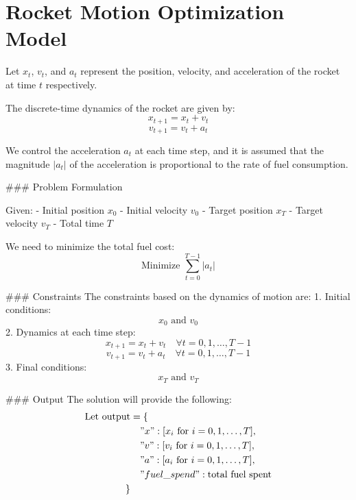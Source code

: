 \documentclass{article}
\begin{document}
\section*{Rocket Motion Optimization Model}

Let \( x_t \), \( v_t \), and \( a_t \) represent the position, velocity, and acceleration of the rocket at time \( t \) respectively. 

The discrete-time dynamics of the rocket are given by:
\[
x_{t+1} = x_t + v_t
\]
\[
v_{t+1} = v_t + a_t
\]

We control the acceleration \( a_t \) at each time step, and it is assumed that the magnitude \( |a_t| \) of the acceleration is proportional to the rate of fuel consumption.

### Problem Formulation

Given:
- Initial position \( x_0 \)
- Initial velocity \( v_0 \)
- Target position \( x_T \)
- Target velocity \( v_T \)
- Total time \( T \)

We need to minimize the total fuel cost:
\[
\text{Minimize } \sum_{t=0}^{T-1} |a_t|
\]

### Constraints
The constraints based on the dynamics of motion are:
1. Initial conditions:
   \[
   x_0 \text{ and } v_0
   \]
2. Dynamics at each time step:
   \[
   x_{t+1} = x_t + v_t \quad \forall t = 0, 1, \ldots, T-1
   \]
   \[
   v_{t+1} = v_t + a_t \quad \forall t = 0, 1, \ldots, T-1
   \]
3. Final conditions:
   \[
   x_T \text{ and } v_T
   \]

### Output
The solution will provide the following:
\[
\begin{align*}
\text{Let } \text{output} &= \{ \\
&\quad "x": [x_i \text{ for } i = 0, 1, \ldots, T], \\
&\quad "v": [v_i \text{ for } i = 0, 1, \ldots, T], \\
&\quad "a": [a_i \text{ for } i = 0, 1, \ldots, T], \\
&\quad "fuel\_spend": \text{total fuel spent} \\
\}
\end{align*}
\]
\end{document}
